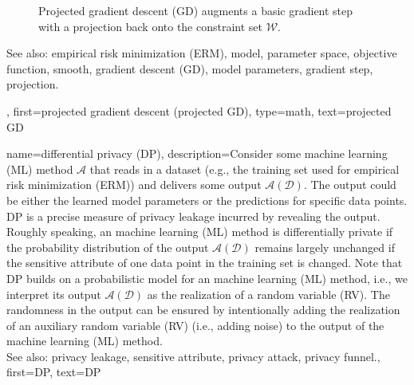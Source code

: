 {{{\begin{figure}[H]
\begin{center}
		\vspace*{-5mm}
		\end{center}
		\caption{Projected gradient descent (GD) augments a basic gradient step with a projection back 
		onto the constraint set $\mathcal{W}$.}
		\label{fig_projected_GD_dict}
		\end{figure}
		See also: empirical risk minimization (ERM), model, parameter space, objective function, smooth, gradient descent (GD), model parameters, gradient step, projection.},
	first={projected gradient descent (projected GD)},
	type=math, 
	text={projected GD}
}

{name={differential privacy (DP)},
  description={Consider some machine learning (ML) method $\mathcal{A}$ 
  	that reads in a dataset (e.g., the training set 
  	used for empirical risk minimization (ERM)) and delivers some output $\mathcal{A}(\mathcal{D})$. The output 
  	could be either the learned model parameters or the predictions for specific data points. 
  	DP is a precise measure of privacy leakage incurred by revealing the 
  	output. Roughly speaking, an machine learning (ML) method is differentially private if the probability distribution 
  	of the output $\mathcal{A}(\mathcal{D})$ remains largely unchanged if the sensitive attribute 
  	of one data point in the training set is changed. Note that DP 
  	builds on a probabilistic model for an machine learning (ML) method, i.e., we interpret its output $\mathcal{A}(\mathcal{D})$ 
  	as the realization of a random variable (RV). The randomness in the output can be ensured 
  	by intentionally adding the realization of an auxiliary random variable (RV) (i.e., adding noise) to 
  	the output of the machine learning (ML) method.
				\\ 
	See also: privacy leakage, sensitive attribute, privacy attack, privacy funnel.}, 
  first={DP}, 
  text={DP} 
}

}
